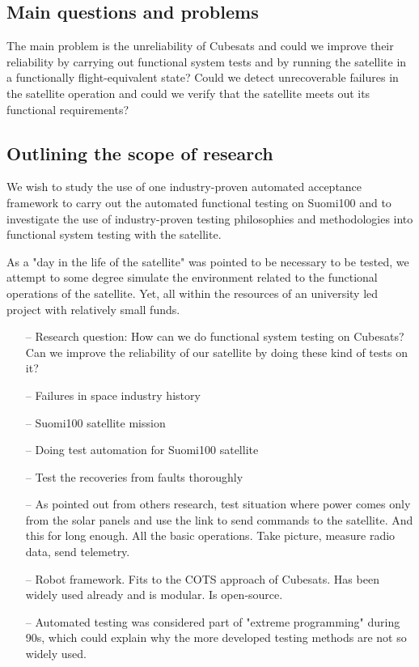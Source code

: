 \documentclass[english,12pt,a4paper,pdftex,elec,utf8]{aaltothesis}
\begin{document}
\subsection{Main questions and problems}
The main problem is the unreliability of Cubesats and could we improve their reliability by carrying out functional system tests and by running the satellite in a functionally flight-equivalent state? Could we detect unrecoverable failures in the satellite operation and could we verify that the satellite meets out its functional requirements?
\subsection{Outlining the scope of research}
We wish to study the use of one industry-proven automated acceptance framework to carry out the automated functional testing on Suomi100 and to investigate the use of industry-proven testing philosophies and methodologies into functional system testing with the satellite.\par
As a "day in the life of the satellite" was pointed to be necessary to be tested, we attempt to some degree simulate the environment related to the functional operations of the satellite.  Yet, all within the resources of an university led project with relatively small funds.


\begin{itemize}
\item[--] Research question: How can we do functional system testing on Cubesats? Can we improve the reliability of our satellite by doing these kind of tests on it?
\item[--]Failures in space industry history
\item[--]Suomi100 satellite mission
\item[--]Doing test automation for Suomi100 satellite

\item[--]Test the recoveries from faults thoroughly
\item[--]As pointed out from others research, test situation where power comes only from the solar panels and use the link to send commands to the satellite. And this for long enough. All the basic operations. Take picture, measure radio data, send telemetry.
\item[--]Robot framework. Fits to the COTS approach of Cubesats. Has been widely used already and is modular. Is open-source.
\item[--]Automated testing was considered part of "extreme programming" during 90s, which could explain why the more developed testing methods are not so widely used.
\end{itemize}
\end{document}
